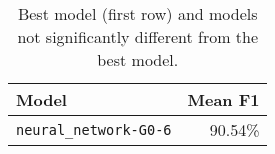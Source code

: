 \begin{table}[H]
\centering
\capstart
\begin{tabularx}{0.48\textwidth}{|X|r|}
\hline
Model & Mean F1 \\
\hline
\texttt{neural\_network-G0-6} & 90.54\% \\
\hline
\end{tabularx}
\caption{Best model (first row) and models not significantly different from the best model.}
\label{tab:best_models}

\end{table}
